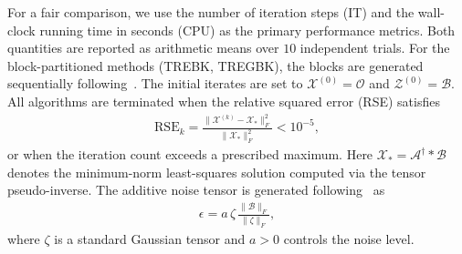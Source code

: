 \documentclass[11pt]{article}
\def\fm#1{\mathcal{#1}}
\begin{document}
For a fair comparison, we use the number of iteration steps (IT) and the wall-clock running time in seconds (CPU) as the primary performance metrics. Both quantities are reported as arithmetic means over $10$ independent trials. For the block-partitioned methods (TREBK, TREGBK), the blocks are generated sequentially following~\cite{du2020rando}. The initial iterates are set to $\fm X^{(0)} = \fm O$ and $\fm Z^{(0)} = \fm B$. All algorithms are terminated when the relative squared error (RSE) satisfies
\begin{align*}
    \mathrm{RSE}_k = \frac{\bigl\|\fm X^{(k)} - \fm X_\ast\bigr\|_F^2}{\|\fm X_\ast\|_F^2} < 10^{-5},
\end{align*}
or when the iteration count exceeds a prescribed maximum. Here $\fm X_\ast = \fm A^\dagger * \fm B$ denotes the minimum-norm least-squares solution computed via the tensor pseudo-inverse. The additive noise tensor is generated following~\cite{huang2023TREK} as
\begin{align}
    \fm\epsilon = a\,\fm\zeta\,\frac{\|\fm B\|_F}{\|\fm\zeta\|_F}, \label{eq:noise}
\end{align}
where $\fm\zeta$ is a standard Gaussian tensor and $a > 0$ controls the noise level.
\end{document}
